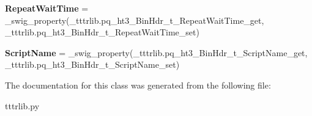 \begin{DoxyCompactItemize}
\item 
\mbox{\label{classtttrlib_1_1pq__ht3___bin_hdr__t_ae0191ae5e713d2c0113ae5dbc129e101}} 
{\bfseries Repeat\+Wait\+Time} = \+\_\+swig\+\_\+property(\+\_\+tttrlib.\+pq\+\_\+ht3\+\_\+\+Bin\+Hdr\+\_\+t\+\_\+\+Repeat\+Wait\+Time\+\_\+get, \+\_\+tttrlib.\+pq\+\_\+ht3\+\_\+\+Bin\+Hdr\+\_\+t\+\_\+\+Repeat\+Wait\+Time\+\_\+set)
\item 
\mbox{\label{classtttrlib_1_1pq__ht3___bin_hdr__t_a996422bfb4cbbdc247073edf0c57d1f6}} 
{\bfseries Script\+Name} = \+\_\+swig\+\_\+property(\+\_\+tttrlib.\+pq\+\_\+ht3\+\_\+\+Bin\+Hdr\+\_\+t\+\_\+\+Script\+Name\+\_\+get, \+\_\+tttrlib.\+pq\+\_\+ht3\+\_\+\+Bin\+Hdr\+\_\+t\+\_\+\+Script\+Name\+\_\+set)
\end{DoxyCompactItemize}


The documentation for this class was generated from the following file\+:\begin{DoxyCompactItemize}
\item 
tttrlib.\+py\end{DoxyCompactItemize}
